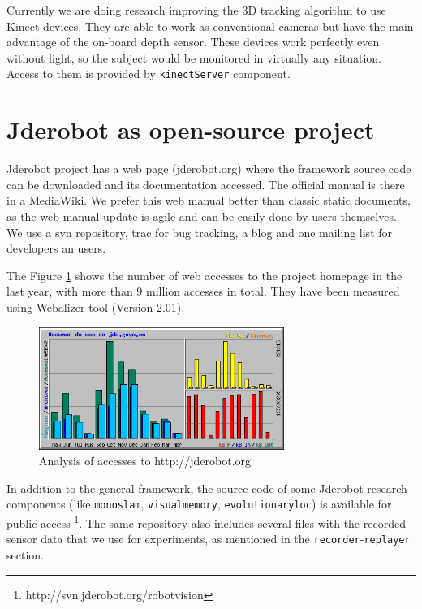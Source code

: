 \documentclass[twocolumn]{svjour3}          %
\begin{document}
Currently we are doing research improving the 3D tracking algorithm to use Kinect devices. They are able to work as conventional cameras but have the main advantage of the on-board depth sensor. These devices work perfectly even without light, so the subject would be monitored in virtually any situation. Access to them is provided by \texttt{kinectServer} component.

\section{Jderobot as open-source project}

Jderobot project has a web page (jderobot.org) where the framework source code can be downloaded and its documentation accessed. The official manual is there in a MediaWiki. We prefer this web manual better than classic static documents, as the web manual update is agile and can be easily done by users themselves. We use a svn repository, trac for bug tracking, a blog and one mailing list for developers an users.

The Figure \ref{fig:svn-wiki} shows the number of web accesses to the project homepage in the last year, with more than 9 million accesses in total. They have been measured using Webalizer tool (Version 2.01).

\begin{figure}
\begin{center}
  \includegraphics[width=8cm]{figs/usage-jderobot-wiki.png}
\caption{Analysis of accesses to http://jderobot.org}
\end{center}
\label{fig:svn-wiki}
\end{figure}

In addition to the general framework, the source code of some Jderobot research components (like \texttt{monoslam}, \texttt{visualmemory}, \texttt{evolutionaryloc}) is available for public access \footnote{http://svn.jderobot.org/robotvision}. The same repository also includes several files with the recorded sensor data that we use for experiments, as mentioned in the \texttt{recorder}-\texttt{replayer} section.
\end{document}
